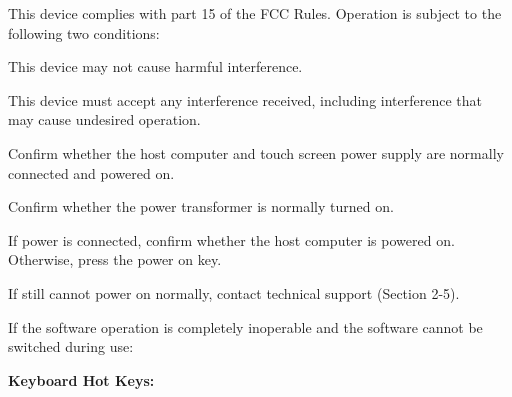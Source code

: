 \documentclass[11pt,a4paper]{article}
\begin{document}
\begin{tbkSpecTable}[caption={Computer Specifications}]
\end{tbkSpecTable}



This device complies with part 15 of the FCC Rules. Operation is subject to the
following two conditions:

\begin{tbkNumberedList}
  \item This device may not cause harmful interference.
  \item This device must accept any interference received, including interference
        that may cause undesired operation.
\end{tbkNumberedList}



\begin{tbkSteps}
  \item Confirm whether the host computer and touch screen power supply are
        normally connected and powered on.
  \item Confirm whether the power transformer is normally turned on.
  \item If power is connected, confirm whether the host computer is powered on.
        Otherwise, press the power on key.
  \item If still cannot power on normally, contact technical support (Section 2-5).
\end{tbkSteps}


If the software operation is completely inoperable and the software cannot be
switched during use:

\textbf{Keyboard Hot Keys:}
\end{document}
